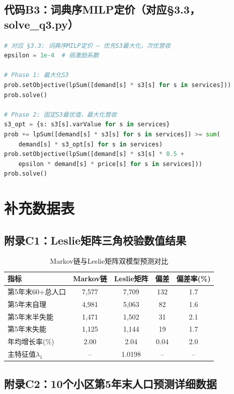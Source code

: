 \documentclass[12pt,a4paper]{ctexart}
\begin{document}
\subsection*{代码B3：词典序MILP定价（对应§3.3，solve\_q3.py）}

\begin{lstlisting}[language=Python, caption={词典序目标定价MILP}]
# 对应 §3.3: 词典序MILP定价 — 优先S3最大化，次优营收
epsilon = 1e-4  # 弱激励系数

# Phase 1: 最大化S3
prob.setObjective(lpSum([demand[s] * s3[s] for s in services]))
prob.solve()

# Phase 2: 固定S3最优值，最大化营收
s3_opt = {s: s3[s].varValue for s in services}
prob += lpSum([demand[s] * s3[s] for s in services]) >= sum(
    demand[s] * s3_opt[s] for s in services)
prob.setObjective(lpSum([demand[s] * s3[s] * 0.5 +
    epsilon * demand[s] * price[s] for s in services]))
prob.solve()
\end{lstlisting}

\section{补充数据表}

\subsection*{附录C1：Leslie矩阵三角校验数值结果}

\begin{table}[H]
\centering
\caption{Markov链与Leslie矩阵双模型预测对比}
\label{tab:leslie_check}
\begin{tabular}{lcccc}
\toprule
\textbf{指标} & \textbf{Markov链} & \textbf{Leslie矩阵} & \textbf{偏差} & \textbf{偏差率(\%)} \\
\midrule
第5年末60+总人口 & 7,577 & 7,709 & 132 & 1.7 \\
第5年末自理 & 4,981 & 5,063 & 82 & 1.6 \\
第5年末半失能 & 1,471 & 1,502 & 31 & 2.1 \\
第5年末失能 & 1,125 & 1,144 & 19 & 1.7 \\
年均增长率(\%) & 2.00 & 2.04 & 0.04 & 2.0 \\
主特征值$\lambda_1$ & -- & 1.0198 & -- & -- \\
\bottomrule
\end{tabular}
\end{table}

\subsection*{附录C2：10个小区第5年末人口预测详细数据}
\end{document}
